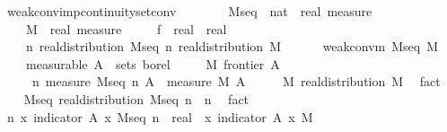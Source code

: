 \documentclass[leqno]{article}
\theoremstyle{definition}
\begin{document}
\begin{isabellebody}
\isamarkupfalse%
\ weak{\isacharunderscore}conv{\isacharunderscore}imp{\isacharunderscore}continuity{\isacharunderscore}set{\isacharunderscore}conv{\isacharcolon}\isanewline
\ \ \ \isanewline
\ \ \ \ M{\isacharunderscore}seq\ {\isacharcolon}{\isacharcolon}\ {\isachardoublequoteopen}nat\ {\isasymRightarrow}\ real\ measure{\isachardoublequoteclose}\ \isanewline
\ \ \ \ M\ {\isacharcolon}{\isacharcolon}\ {\isachardoublequoteopen}real\ measure{\isachardoublequoteclose}\ \isanewline
\ \ \ \ f\ {\isacharcolon}{\isacharcolon}\ {\isachardoublequoteopen}real\ {\isasymRightarrow}\ real{\isachardoublequoteclose}\isanewline
\ \ \ \isanewline
\ \ \ \ {\isachardoublequoteopen}{\isasymAnd}n{\isachardot}\ real{\isacharunderscore}distribution\ {\isacharparenleft}M{\isacharunderscore}seq\ n{\isacharparenright}{\isachardoublequoteclose}\ {\isachardoublequoteopen}real{\isacharunderscore}distribution\ M{\isachardoublequoteclose}\ \ \isanewline
\ \ \ \ {\isachardoublequoteopen}weak{\isacharunderscore}conv{\isacharunderscore}m\ M{\isacharunderscore}seq\ M{\isachardoublequoteclose}\ \isanewline
\ \ \ \ {\isacharbrackleft}measurable{\isacharbrackright}{\isacharcolon}\ {\isachardoublequoteopen}A\ {\isasymin}\ sets\ borel{\isachardoublequoteclose}\ \isanewline
\ \ \ \ {\isachardoublequoteopen}M\ {\isacharparenleft}frontier\ A{\isacharparenright}\ {\isacharequal}\ {}{\isachardoublequoteclose}\isanewline
\ \ \ \isanewline
\ \ \ \ {\isachardoublequoteopen}{\isacharparenleft}{\isasymlambda}\ n{\isachardot}\ {\isacharparenleft}measure\ {\isacharparenleft}M{\isacharunderscore}seq\ n{\isacharparenright}\ A{\isacharparenright}{\isacharparenright}\ {\isacharminus}{\isacharminus}{\isacharminus}{\isacharminus}{\isachargreater}\ measure\ M\ A{\isachardoublequoteclose}\isanewline
{}\isamarkupfalse%
\ {\isacharminus}\isanewline
\ \ \isamarkupfalse%
\ M{\isacharcolon}\ real{\isacharunderscore}distribution\ M\ \isamarkupfalse%
\ fact\isanewline
\ \ \isamarkupfalse%
\ M{\isacharunderscore}seq{\isacharcolon}\ real{\isacharunderscore}distribution\ {\isachardoublequoteopen}M{\isacharunderscore}seq\ n{\isachardoublequoteclose}\ \ n\ \isamarkupfalse%
\ fact\isanewline
\ \ \isanewline
\ \ \isamarkupfalse%
\ {\isachardoublequoteopen}{\isacharparenleft}{\isasymlambda}n{\isachardot}\ {\isacharparenleft}{\isasymintegral}x{\isachardot}\ indicator\ A\ x\ {\isasympartial}M{\isacharunderscore}seq\ n{\isacharparenright}\ {\isacharcolon}{\isacharcolon}\ real{\isacharparenright}\ {\isacharminus}{\isacharminus}{\isacharminus}{\isacharminus}{\isachargreater}\ {\isacharparenleft}{\isasymintegral}x{\isachardot}\ indicator\ A\ x\ {\isasympartial}M{\isacharparenright}{\isachardoublequoteclose}\isanewline

\end{isabellebody}
\end{document}
